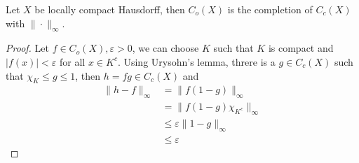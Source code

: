 \begin{theorem}
  Let $X$ be locally compact Hausdorff, then $C_o(X)$ is the
  completion of $C_c(X)$ with $\|\cdot\|_\infty$.
\end{theorem}
\begin{proof}
  Let $f \in C_o(X), \varepsilon > 0$, we can choose $K$ such that
  $K$ is compact and $|f(x)| < \varepsilon$ for all $x \in K^c$.
  Using Urysohn's lemma, threre is a $g \in C_c(X)$ such that $\chi_K
  \le g \le 1$, then $h = fg \in C_c(X)$ and
  \begin{align*}
    \|h - f\|_\infty &= \|f(1 - g)\|_\infty \\
    &= \|f(1-g) \chi_{K^c}\|_\infty \\
    &\le \varepsilon \|1 -g\|_\infty \\
    &\le \varepsilon
  \end{align*}
\end{proof}



